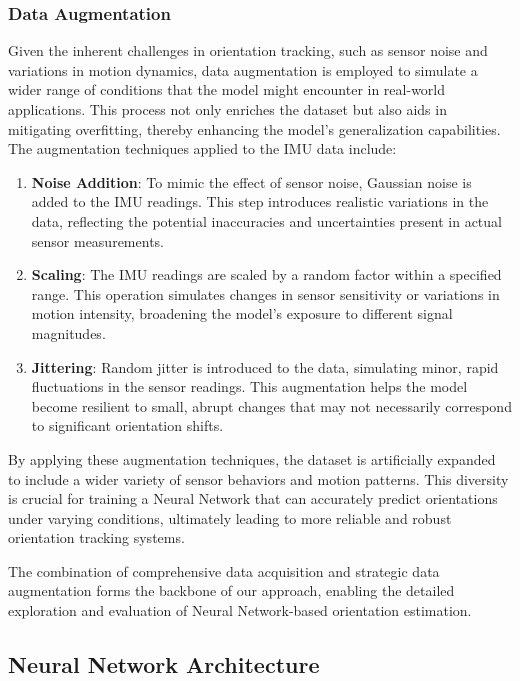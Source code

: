 \documentclass[conference]{IEEEtran}
\begin{document}
\subsubsection{Data Augmentation}

Given the inherent challenges in orientation tracking, such as sensor noise and variations in motion dynamics, data augmentation is employed to simulate a wider range of conditions that the model might encounter in real-world applications. This process not only enriches the dataset but also aids in mitigating overfitting, thereby enhancing the model's generalization capabilities. The augmentation techniques applied to the IMU data include:

\begin{enumerate}
\item \textbf{Noise Addition}: To mimic the effect of sensor noise, Gaussian noise is added to the IMU readings. This step introduces realistic variations in the data, reflecting the potential inaccuracies and uncertainties present in actual sensor measurements.

\item \textbf{Scaling}: The IMU readings are scaled by a random factor within a specified range. This operation simulates changes in sensor sensitivity or variations in motion intensity, broadening the model's exposure to different signal magnitudes.

\item \textbf{Jittering}: Random jitter is introduced to the data, simulating minor, rapid fluctuations in the sensor readings. This augmentation helps the model become resilient to small, abrupt changes that may not necessarily correspond to significant orientation shifts.
\end{enumerate}

By applying these augmentation techniques, the dataset is artificially expanded to include a wider variety of sensor behaviors and motion patterns. This diversity is crucial for training a Neural Network that can accurately predict orientations under varying conditions, ultimately leading to more reliable and robust orientation tracking systems.

The combination of comprehensive data acquisition and strategic data augmentation forms the backbone of our approach, enabling the detailed exploration and evaluation of Neural Network-based orientation estimation.

\subsection{Neural Network Architecture}
\end{document}
